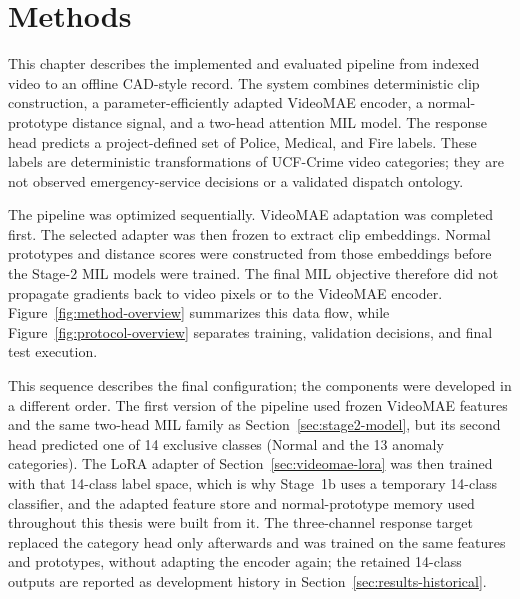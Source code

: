 \chapter{Methods}
\label{chap:methods}

This chapter describes the implemented and evaluated pipeline from indexed video to an offline CAD-style record. The system combines deterministic clip construction, a parameter-efficiently adapted VideoMAE encoder, a normal-prototype distance signal, and a two-head attention MIL model. The response head predicts a project-defined set of Police, Medical, and Fire labels. These labels are deterministic transformations of UCF-Crime video categories; they are not observed emergency-service decisions or a validated dispatch ontology.

The pipeline was optimized sequentially. VideoMAE adaptation was completed first. The selected adapter was then frozen to extract clip embeddings. Normal prototypes and distance scores were constructed from those embeddings before the Stage-2 MIL models were trained. The final MIL objective therefore did not propagate gradients back to video pixels or to the VideoMAE encoder. Figure~\ref{fig:method-overview} summarizes this data flow, while Figure~\ref{fig:protocol-overview} separates training, validation decisions, and final test execution.

This sequence describes the final configuration; the components were developed in a different order. The first version of the pipeline used frozen VideoMAE features and the same two-head MIL family as Section~\ref{sec:stage2-model}, but its second head predicted one of 14 exclusive classes (Normal and the 13 anomaly categories). The LoRA adapter of Section~\ref{sec:videomae-lora} was then trained with that 14-class label space, which is why Stage~1b uses a temporary 14-class classifier, and the adapted feature store and normal-prototype memory used throughout this thesis were built from it. The three-channel response target replaced the category head only afterwards and was trained on the same features and prototypes, without adapting the encoder again; the retained 14-class outputs are reported as development history in Section~\ref{sec:results-historical}.


